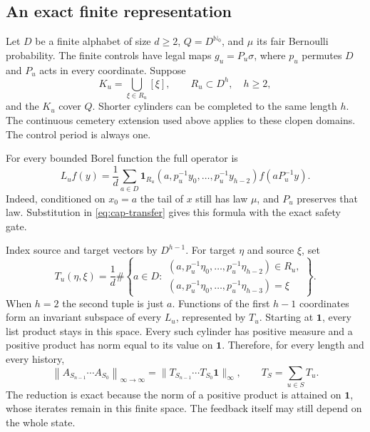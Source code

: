 \documentclass[11pt,reqno]{amsart}
\numberwithin{equation}{section}
\theoremstyle{definition}
\theoremstyle{definition}
\newcommand{\Nzero}{\mathbb N_0}
\newcommand{\one}{\mathbf 1}
\newcommand{\opnorm}[1]{\left\|#1\right\|_{\infty\to\infty}}
\begin{document}
\subsection{An exact finite representation}
Let $D$ be a finite alphabet of size $d\ge2$, $Q=D^{\Nzero}$,
and $\mu$ its fair Bernoulli probability. The finite controls have
legal maps $g_u=P_u\sigma$, where $p_u$ permutes $D$ and $P_u$
acts in every coordinate. Suppose
\[
 K_u=\bigcup_{\xi\in R_u}[\xi],\qquad R_u\subset D^h,
 \quad h\ge2,
\]
and the $K_u$ cover $Q$. Shorter cylinders can be completed to the
same length $h$. The continuous cemetery extension used above
applies to these clopen domains. The control period is always one.

For every bounded Borel function the full operator is
\begin{equation}\label{eq:cyl-operator}
 L_uf(y)=\frac1d\sum_{a\in D}
 \one_{R_u}(a,p_u^{-1}y_0,\ldots,p_u^{-1}y_{h-2})
 f(aP_u^{-1}y).
\end{equation}
Indeed, conditioned on $x_0=a$ the tail of $x$ still has law $\mu$,
and $P_u$ preserves that law. Substitution in
\eqref{eq:cap-transfer} gives this formula with the exact safety gate.

Index source and target vectors by $D^{h-1}$. For target $\eta$
and source $\xi$, set
\begin{equation}\label{eq:cyl-matrix}
 T_u(\eta,\xi)=\frac1d\#\left\{a\in D:
 \begin{array}{l}
 (a,p_u^{-1}\eta_0,\ldots,p_u^{-1}\eta_{h-2})\in R_u,\\
 (a,p_u^{-1}\eta_0,\ldots,p_u^{-1}\eta_{h-3})=\xi
 \end{array}\right\}.
\end{equation}
When $h=2$ the second tuple is just $a$.
Functions of the first $h-1$ coordinates form an invariant subspace
of every $L_u$, represented by $T_u$. Starting at $\one$, every
list product stays in this space. Every such cylinder has positive
measure and a positive product has norm equal to its value on $\one$.
Therefore, for every length and every history,
\begin{equation}\label{eq:cyl-fullnorm}
 \opnorm{A_{S_{n-1}}\cdots A_{S_0}}
 =\|T_{S_{n-1}}\cdots T_{S_0}\one\|_\infty,
 \qquad T_S=\sum_{u\in S}T_u.
\end{equation}
The reduction is exact because the norm of a positive product is
attained on $\one$, whose iterates remain in this finite space.
The feedback itself may still depend on the whole state.
\end{document}
